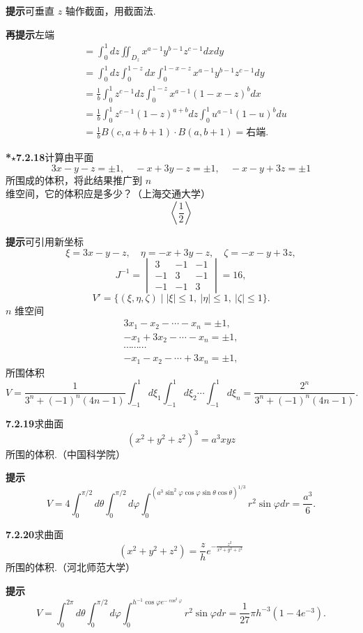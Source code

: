 \documentclass[UTF8,12pt,a4paper,fontset=fandol]{ctexart}
\begin{document}
\noindent\textbf{提示}\quad 可垂直 $z$ 轴作截面，用截面法.

\noindent\textbf{再提示}\quad 左端
\[
\begin{aligned}
&=\int_0^1dz\iint_{D_z}x^{a-1}y^{b-1}z^{c-1}dxdy\\
&=\int_0^1dz\int_0^{1-z}dx\int_0^{1-x-z}x^{a-1}y^{b-1}z^{c-1}dy\\
&=\frac1b\int_0^1z^{c-1}dz\int_0^{1-z}x^{a-1}(1-x-z)^bdx\\
&=\frac1b\int_0^1z^{c-1}(1-z)^{a+b}dz
\int_0^1u^{a-1}(1-u)^bdu\\
&=\frac1b B(c,a+b+1)\cdot B(a,b+1)=\text{右端}.
\end{aligned}
\]

\noindent\textbf{*$\star$7.2.18}\quad 计算由平面
\[
3x-y-z=\pm1,\quad -x+3y-z=\pm1,\quad -x-y+3z=\pm1
\]
所围成的体积，将此结果推广到 $n$ 维空间，它的体积应是多少？（上海交通大学）
\[
\left\langle\frac12\right\rangle
\]

\noindent\textbf{提示}\quad 可引用新坐标
\[
\xi=3x-y-z,\quad \eta=-x+3y-z,\quad \zeta=-x-y+3z,
\]
\[
J^{-1}=\begin{vmatrix}3&-1&-1\\-1&3&-1\\-1&-1&3\end{vmatrix}=16,
\]
\[
V'=\{(\xi,\eta,\zeta)\mid |\xi|\le1,\ |\eta|\le1,\ |\zeta|\le1\}.
\]
$n$ 维空间
\[
\begin{gathered}
3x_1-x_2-\cdots-x_n=\pm1,\\
-x_1+3x_2-\cdots-x_n=\pm1,\\
\cdots\cdots\cdots\\
-x_1-x_2-\cdots+3x_n=\pm1,
\end{gathered}
\]
所围体积
\[
V=\frac1{3^n+(-1)^n(4n-1)}\int_{-1}^1d\xi_1
\int_{-1}^1d\xi_2\cdots\int_{-1}^1d\xi_n
=\frac{2^n}{3^n+(-1)^n(4n-1)}.
\]

\noindent\textbf{7.2.19}\quad 求曲面
\[
(x^2+y^2+z^2)^3=a^3xyz
\]
所围的体积.（中国科学院）

\noindent\textbf{提示}\quad
\[
V=4\int_0^{\pi/2}d\theta\int_0^{\pi/2}d\varphi
\int_0^{(a^3\sin^2\varphi\cos\varphi\sin\theta\cos\theta)^{1/3}}
r^2\sin\varphi dr
=\frac{a^3}{6}.
\]

\noindent\textbf{7.2.20}\quad 求曲面
\[
(x^2+y^2+z^2)=\frac zh e^{-\frac{z^2}{x^2+y^2+z^2}}
\]
所围的体积.（河北师范大学）

\noindent\textbf{提示}\quad
\[
V=\int_0^{2\pi}d\theta\int_0^{\pi/2}d\varphi
\int_0^{h^{-1}\cos\varphi e^{-\cos^2\varphi}}r^2\sin\varphi dr
=\frac1{27}\pi h^{-3}(1-4e^{-3}).
\]
\end{document}

